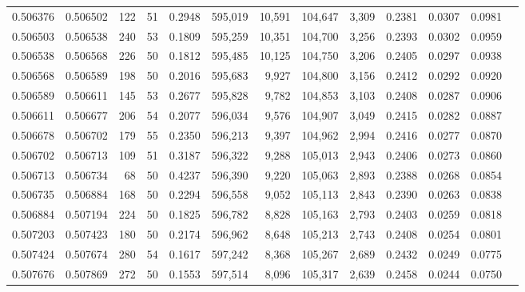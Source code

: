 \begin{tabular}{rrrrrrrrrrrrr}
0.506376 & 0.506502 & 122 &  51 &                                     0.2948 & 595,019 &  10,591 & 104,647 &   3,309 & 0.2381 & 0.0307 & 0.0981 \\
0.506503 & 0.506538 & 240 &  53 &                                     0.1809 & 595,259 &  10,351 & 104,700 &   3,256 & 0.2393 & 0.0302 & 0.0959 \\
0.506538 & 0.506568 & 226 &  50 &                                     0.1812 & 595,485 &  10,125 & 104,750 &   3,206 & 0.2405 & 0.0297 & 0.0938 \\
0.506568 & 0.506589 & 198 &  50 &                                     0.2016 & 595,683 &   9,927 & 104,800 &   3,156 & 0.2412 & 0.0292 & 0.0920 \\
0.506589 & 0.506611 & 145 &  53 &                                     0.2677 & 595,828 &   9,782 & 104,853 &   3,103 & 0.2408 & 0.0287 & 0.0906 \\
0.506611 & 0.506677 & 206 &  54 &                                     0.2077 & 596,034 &   9,576 & 104,907 &   3,049 & 0.2415 & 0.0282 & 0.0887 \\
0.506678 & 0.506702 & 179 &  55 &                                     0.2350 & 596,213 &   9,397 & 104,962 &   2,994 & 0.2416 & 0.0277 & 0.0870 \\
0.506702 & 0.506713 & 109 &  51 &                                     0.3187 & 596,322 &   9,288 & 105,013 &   2,943 & 0.2406 & 0.0273 & 0.0860 \\
0.506713 & 0.506734 &  68 &  50 &                                     0.4237 & 596,390 &   9,220 & 105,063 &   2,893 & 0.2388 & 0.0268 & 0.0854 \\
0.506735 & 0.506884 & 168 &  50 &                                     0.2294 & 596,558 &   9,052 & 105,113 &   2,843 & 0.2390 & 0.0263 & 0.0838 \\
0.506884 & 0.507194 & 224 &  50 &                                     0.1825 & 596,782 &   8,828 & 105,163 &   2,793 & 0.2403 & 0.0259 & 0.0818 \\
0.507203 & 0.507423 & 180 &  50 &                                     0.2174 & 596,962 &   8,648 & 105,213 &   2,743 & 0.2408 & 0.0254 & 0.0801 \\
0.507424 & 0.507674 & 280 &  54 &                                     0.1617 & 597,242 &   8,368 & 105,267 &   2,689 & 0.2432 & 0.0249 & 0.0775 \\
0.507676 & 0.507869 & 272 &  50 &                                     0.1553 & 597,514 &   8,096 & 105,317 &   2,639 & 0.2458 & 0.0244 & 0.0750 \\

\end{tabular}
